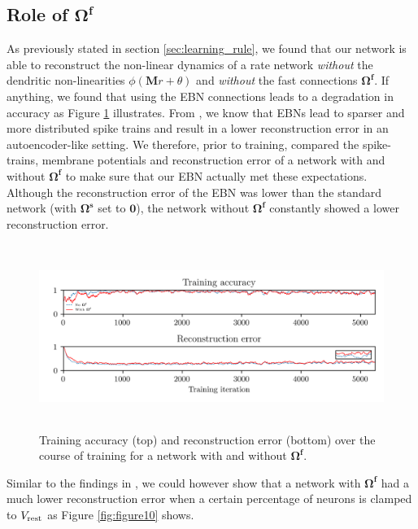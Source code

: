 \documentclass[twoside,11pt,titlepage]{article}
\begin{document}
\subsection{Role of $\mathbf{\Omega^f}$}
As previously stated in section \ref{sec:learning_rule}, we found that our network is able to reconstruct the non-linear dynamics
of a rate network \textit{without} the dendritic non-linearities $\phi(\mathbf{M}r+\theta)$ and \textit{without} the fast connections $\mathbf{\Omega^f}$.  
If anything, we found that using the EBN connections leads to a degradation in accuracy as Figure \ref{fig:figure9} illustrates.
From \cite{Bourdoukan:2012:LOS:2999325.2999390}, we know that EBNs lead to sparser and more distributed spike trains and result in a
lower reconstruction error in an autoencoder-like setting. We therefore, prior to training, compared the spike-trains, membrane potentials and
reconstruction error of a network with and without $\mathbf{\Omega^f}$ to make sure that our EBN actually met these expectations. Although the
reconstruction error of the EBN was lower than the standard network (with $\mathbf{\Omega^s}$ set to $\mathbf{0}$), the network without $\mathbf{\Omega^f}$
constantly showed a lower reconstruction error.

\begin{figure}[!htb]
  \includegraphics[width = \columnwidth, height=6cm]{figures/figure9.png}
  \caption{Training accuracy (top) and reconstruction error (bottom) over the course of
  training for a network with and without $\mathbf{\Omega^f}$.}
  \label{fig:figure9}
\end{figure}

Similar to the findings in \cite{alemi2017learning}, we could however show that a network with $\mathbf{\Omega^f}$ had a much lower
reconstruction error when a certain percentage of neurons is clamped to $V_{\textnormal{rest}}$ as Figure \ref{fig:figure10} shows.
\end{document}
